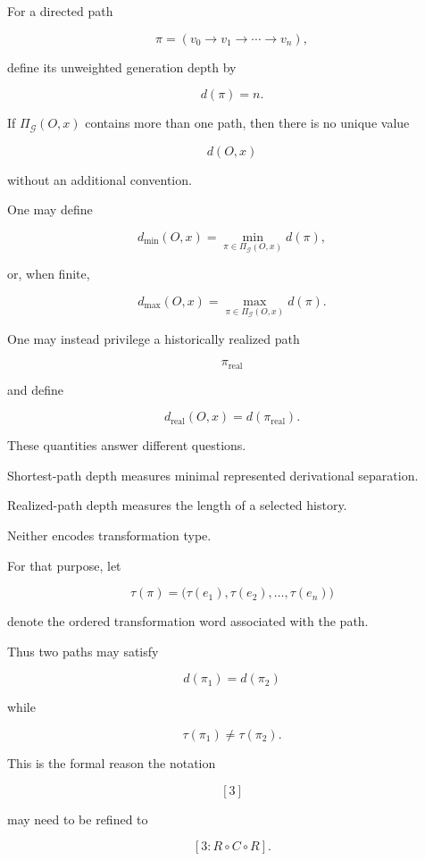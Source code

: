 \documentclass[
  11pt,
  a4paper,
  DIV=12,
  BCOR=0mm,
  parskip=half-
]{scrartcl}
\newcommand{\graphG}{\mathcal G}
\theoremstyle{definition}
\theoremstyle{plain}
\theoremstyle{remark}
\begin{document}
For a directed path

\[
  \pi
  =
  (
  v_0\to v_1\to\cdots\to v_n
  ),
\]

define its unweighted generation depth by

\[
  d(\pi)=n.
\]

If \(\Pi_{\graphG}(O,x)\) contains more than one path, then there is no unique
value

\[
  d(O,x)
\]

without an additional convention.

One may define

\[
  d_{\min}(O,x)
  =
  \min_{\pi\in\Pi_{\graphG}(O,x)}d(\pi),
\]

or, when finite,

\[
  d_{\max}(O,x)
  =
  \max_{\pi\in\Pi_{\graphG}(O,x)}d(\pi).
\]

One may instead privilege a historically realized path

\[
  \pi_{\mathrm{real}}
\]

and define

\[
  d_{\mathrm{real}}(O,x)
  =
  d(\pi_{\mathrm{real}}).
\]

These quantities answer different questions.

Shortest-path depth measures minimal represented derivational separation.

Realized-path depth measures the length of a selected history.

Neither encodes transformation type.

For that purpose, let

\[
  \tau(\pi)
  =
  \bigl(
    \tau(e_1),
    \tau(e_2),
    \ldots,
    \tau(e_n)
  \bigr)
\]

denote the ordered transformation word associated with the path.

Thus two paths may satisfy

\[
  d(\pi_1)=d(\pi_2)
\]

while

\[
  \tau(\pi_1)\neq\tau(\pi_2).
\]

This is the formal reason the notation

\[
  [3]
\]

may need to be refined to

\[
  [3:R\circ C\circ R].
\]

\end{document}
